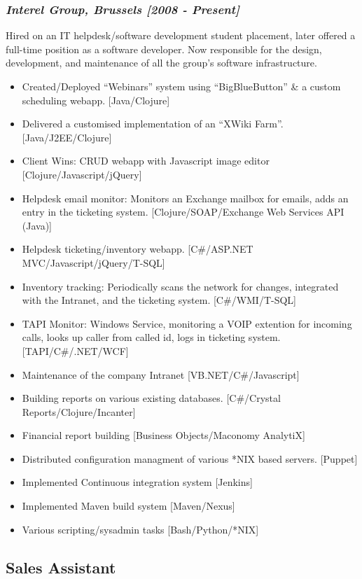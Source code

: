 \documentclass{article}
\begin{document}
\subsubsection*{\emph{Interel Group, Brussels  [2008 - Present]}}
Hired on an IT helpdesk/software development student placement, later offered a full-time position as a software developer. Now responsible for the design, development, and maintenance of all the group's software infrastructure.
\begin{itemize}
\item Created/Deployed ``Webinars'' system using ``BigBlueButton'' \& a custom scheduling webapp. [Java/Clojure]
\item Delivered a customised implementation of an ``XWiki Farm''. [Java/J2EE/Clojure]
\item Client Wins: CRUD webapp with Javascript image editor [Clojure/Javascript/jQuery]
\item Helpdesk email monitor: Monitors an Exchange mailbox for emails, adds an entry in the ticketing system. [Clojure/SOAP/Exchange Web Services API (Java)]
\item Helpdesk ticketing/inventory webapp. [C\#/ASP.NET MVC/Javascript/jQuery/T-SQL]
\item Inventory tracking: Periodically scans the network for changes, integrated with the Intranet, and the ticketing system. [C\#/WMI/T-SQL]
\item TAPI Monitor: Windows Service, monitoring a VOIP extention for incoming calls, looks up caller from called id, logs in ticketing system. [TAPI/C\#/.NET/WCF]
\item Maintenance of the company Intranet [VB.NET/C\#/Javascript]
\item Building reports on various existing databases. [C\#/Crystal Reports/Clojure/Incanter]
\item Financial report building [Business Objects/Maconomy AnalytiX]
\item Distributed configuration managment of various *NIX based servers. [Puppet]
\item Implemented Continuous integration system [Jenkins]
\item Implemented Maven build system [Maven/Nexus]
\item Various scripting/sysadmin tasks [Bash/Python/*NIX]
\end{itemize}
\subsection*{Sales Assistant}
\end{document}
